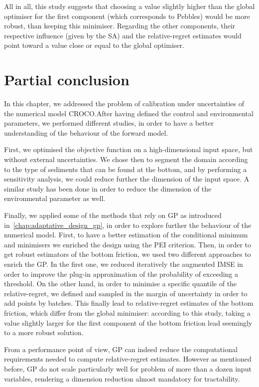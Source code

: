 \documentclass[../../Main_ManuscritThese.tex]{subfiles}
\begin{document}
All in all, this study suggests that choosing a value slightly higher
than the global optimiser for the first component (which corresponds
to Pebbles) would be more robust, than keeping this
minimiser. Regarding the other components, their respective influence
(given by the SA) and the relative-regret estimates would point toward
a value close or equal to the global optimiser.

\section{Partial conclusion}
\label{sec:partial-conclusion}
In this chapter, we addressed the problem of calibration under
uncertainties of the numerical model CROCO.\@ After having defined the
control and environmental parameters, we performed different studies,
in order to have a better understanding of the behaviour of the
forward model.

First, we optimised the objective function on a high-dimensional input
space, but without external uncertainties. We chose then to segment
the domain according to the type of sediments that can be found at the
bottom, and by performing a sensitivity analysis, we could reduce
further the dimension of the input space.
A similar study has been done in order to reduce the dimension of the
environmental parameter as well.

Finally, we applied some of the methods that rely on GP as introduced
in~\cref{chap:adaptative_design_gp}, in order to explore further the
behaviour of the numerical model. First, to have a better estimation
of the conditional minimum and minimisers we enriched the design using
the PEI criterion. Then, in order to get robust estimators of the
bottom friction, we used two different approaches to enrich the GP. In
the first one, we reduced iteratively the augmented IMSE in order to
improve the plug-in approximation of the probability of exceeding a
threshold. On the other hand, in order to minimise a specific quantile
of the relative-regret, we defined and sampled in the margin of
uncertainty in order to add points by batches. This finally lead to
relative-regret estimates of the bottom friction, which differ from
the global minimiser: according to this study, taking a value slightly
larger for the first component of the bottom friction lead seemingly
to a more robust solution.

From a performance point of view, GP can indeed reduce the
computational requirements needed to compute relative-regret
estimates. However as mentioned before, GP do not scale particularly
well for problem of more than a dozen input variables, rendering a
dimension reduction almost mandatory for tractability.
\end{document}
